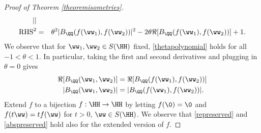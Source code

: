 \begin{proof}[Proof of Theorem \ref{theoremisometries}]
\begin{eqnarray}
|| &  & \\ 
\mathrm{RHS}^2 & = & \theta^2 |B_\QQ(f(\ww_1),f(\ww_2))|^2 - 2\theta \Re[B_\QQ(f(\ww_1),f(\ww_2))] + 1. \nonumber
\end{eqnarray}
We observe that for $\ww_1,\ww_2\in S(\HH)$ fixed, \eqref{thetapolynomial} holds for all $-1 < \theta < 1$. In particular, taking the first and second derivatives and plugging in $\theta = 0$ gives
\begin{align} \label{represerved}
\Re[B_\QQ(\ww_1,\ww_2)] &= \Re[B_\QQ(f(\ww_1),f(\ww_2))]\\ \label{abspreserved}
|B_\QQ(\ww_1,\ww_2)| &= |B_\QQ(f(\ww_1),f(\ww_2))|.
\end{align}
Extend $f$ to a bijection $f:\HH\to\HH$ by letting $f(\0) = \0$ and $f(t\ww) = tf(\ww)$ for $t > 0$, $\ww\in S(\HH)$. We observe that \eqref{represerved} and \eqref{abspreserved} hold also for the extended version of $f$.


\end{proof}
